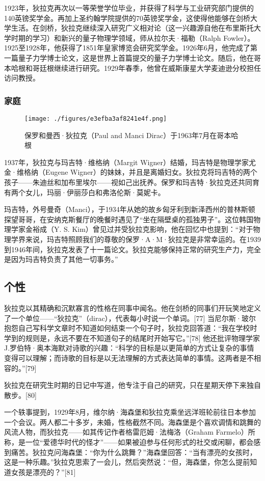 1923年，狄拉克再次以一等荣誉学位毕业，并获得了科学与工业研究部门提供的140英镑奖学金。再加上圣约翰学院提供的70英镑奖学金，这使得他能够在剑桥大学生活。在剑桥，狄拉克继续深入研究广义相对论（这一兴趣源自他在布里斯托大学时期的学习）和新兴的量子物理学领域，师从拉尔夫·福勒（Ralph Fowler）。1925至1928年，他获得了1851年皇家博览会研究奖学金。1926年6月，他完成了第一篇量子力学博士论文，这是世界上首篇提交的量子力学博士论文。随后，他在哥本哈根和哥廷根继续进行研究。1929年春季，他曾在威斯康星大学麦迪逊分校担任访问教授。
\subsubsection{家庭}
\begin{figure}[ht]
\centering
\texttt{[image: ./figures/e3efba3af8241e4f.png]}
\caption{保罗和曼西·狄拉克（Paul and Manci Dirac）于1963年7月在哥本哈根} \label{fig_DLK1_3}
\end{figure}
1937年，狄拉克与玛吉特·维格纳（Margit Wigner）结婚，玛吉特是物理学家尤金·维格纳（Eugene Wigner）的妹妹，并且是离婚妇女。狄拉克将玛吉特的两个孩子——朱迪丝和加布里埃尔——视如己出抚养。保罗和玛吉特·狄拉克还共同育有两个女儿，玛丽·伊丽莎白和弗洛伦斯·莫妮卡。

玛吉特，外号曼奇（Manci），于1934年从她的故乡匈牙利到新泽西州的普林斯顿探望哥哥，在安纳克斯餐厅的晚餐时遇见了“坐在隔壁桌的孤独男子”。这位韩国物理学家金裕成（Y. S. Kim）曾见过并受狄拉克影响，他在回忆中也提到：“对于物理学界来说，玛吉特照顾我们的尊敬的保罗·A·M·狄拉克是非常幸运的。在1939到1946年间，狄拉克发表了十一篇论文。狄拉克能够保持正常的研究生产力，完全是因为玛吉特负责了其他一切事务。”
\subsection{个性} 
狄拉克以其精确和沉默寡言的性格在同事中闻名。他在剑桥的同事们开玩笑地定义了一个单位——“狄拉克”（dirac），代表每小时说一个单词。[77] 当尼尔斯·玻尔抱怨自己写科学文章时不知道如何结束一个句子时，狄拉克回答道：“我在学校时学到的规则是，永远不要在不知道句子的结尾时开始写它。”[78] 他还批评物理学家J.罗伯特·奥本海默对诗歌的兴趣：“科学的目标是以更简单的方式让复杂的事情变得可以理解；而诗歌的目标是以无法理解的方式表达简单的事情。这两者是不相容的。”[79]  

狄拉克在研究生时期的日记中写道，他专注于自己的研究，只在星期天停下来独自散步。[80]  

一个轶事提到，1929年8月，维尔纳·海森堡和狄拉克乘坐远洋班轮前往日本参加一个会议。两人都二十多岁，未婚，性格截然不同。海森堡是个喜欢调情和跳舞的风流人物，而狄拉克——如其传记作者格雷厄姆·法梅洛（Graham Farmelo）所称，是一位“爱德华时代的怪才”——如果被迫参与任何形式的社交或闲聊，都会感到痛苦。狄拉克问海森堡：“你为什么跳舞？”海森堡回答：“当有漂亮的女孩时，这是一种乐趣。”狄拉克思索了一会儿，然后突然说：“但，海森堡，你怎么提前知道女孩是漂亮的？”[81]  

